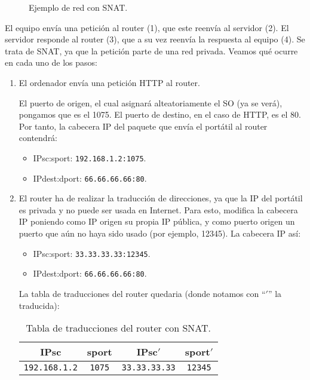 \begin{ejemplo}
\begin{figure}
\begin{tikzpicture}[node distance=6cm]
        \end{tikzpicture}
        \caption{Ejemplo de red con \acrshort{SNAT}.}
        \label{fig:ejemplo_nat}
    \end{figure}

    El equipo envía una petición al router (1), que este reenvía al servidor (2). El servidor responde al router (3), que a su vez reenvía la respuesta al equipo (4). Se trata de \acrshort{SNAT}, ya que la petición parte de una red privada. Veamos qué ocurre en cada uno de los pasos:
    \begin{enumerate}[label=(\arabic*)]
        \item El ordenador envía una petición \acrshort{HTTP} al router.
        
        El puerto de origen, el cual asignará alteatoriamente el SO (ya se verá), pongamos que es el 1075. El puerto de destino, en el caso de \acrshort{HTTP}, es el 80. Por tanto, la cabecera IP del paquete que envía el portátil al router contendrá:
        \begin{itemize}
            \item {IPsc}:{sport}: \verb|192.168.1.2:1075|.
            \item {IPdest}:{dport}: \verb|66.66.66.66:80|.
        \end{itemize}
            
        \item El router ha de realizar la traducción de direcciones, ya que la IP del portátil es privada y no puede ser usada en Internet. Para esto, modifica la cabecera IP poniendo como IP origen su propia IP pública, y como puerto origen un puerto que aún no haya sido usado (por ejemplo, 12345). La cabecera IP así:
        \begin{itemize}
            \item {IPsc}:{sport}: \verb|33.33.33.33:12345|.
            \item {IPdest}:{dport}: \verb|66.66.66.66:80|.
        \end{itemize}

        La tabla de traducciones del router quedaria (donde notamos con ``$'$'' la traducida):
        \begin{table}[H]
            \centering
            \begin{tabular}{|c|c||c|c|}
                \hline
                IPsc & sport & IPsc$'$ & sport$'$ \\
                \hline
                \verb|192.168.1.2| & \verb|1075| & \verb|33.33.33.33| & \verb|12345|\\
                \hline
            \end{tabular}
            \caption{Tabla de traducciones del router con SNAT.}
            \label{tab:tabla_traducciones}            
        \end{table}


\end{enumerate}
\end{ejemplo}
